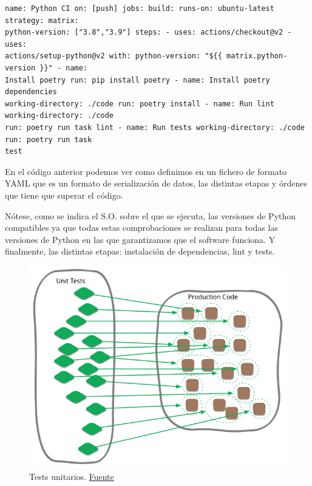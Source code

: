 \begin{lstlisting}[caption=Definición de las etapas de la CI del código del proyecto donde se puede apreciar que se especifican las versiones del lenguaje a comprobar. ]
    name: Python CI on: [push] jobs: build: runs-on: ubuntu-latest strategy: matrix:
python-version: ["3.8","3.9"] steps: - uses: actions/checkout@v2 - uses:
actions/setup-python@v2 with: python-version: "${{ matrix.python-version }}" - name:
Install poetry run: pip install poetry - name: Install poetry dependencies
working-directory: ./code run: poetry install - name: Run lint working-directory: ./code
run: poetry run task lint - name: Run tests working-directory: ./code run: poetry run task
test
\end{lstlisting}

En el código anterior podemos ver como definimos en un fichero de formato YAML que es un
formato de serialización de datos, las distintas etapas y órdenes que tiene que superar el
código.

Nótese, como se indica el S.O. sobre el que se ejecuta, las versiones de Python
compatibles ya que todas estas comprobaciones se realizan para todas las versiones de
Python en las que garantizamos que el software funciona. Y finalmente, las distintas
etapas: instalación de dependencias, lint y tests.

\FloatBarrier
\begin{figure}[h]
	\centering	
	\includegraphics[width=\textwidth]{doc/logos/imgs/unit-test.png}
    \caption{ Tests unitarios.
    \href{https://martinfowler.com/bliki/images/unitTest/sketch.png}{Fuente}}
    \label{fig:unit-tests}
\end{figure}
\FloatBarrier

